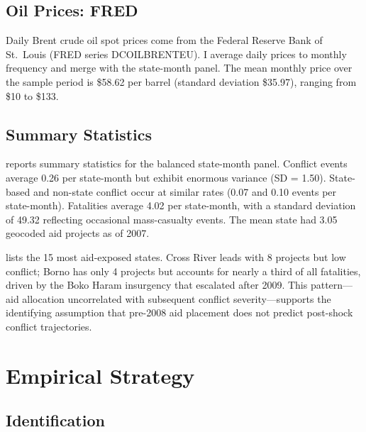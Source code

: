 \documentclass[12pt]{article}
\begin{document}
\subsection{Oil Prices: FRED}

Daily Brent crude oil spot prices come from the Federal Reserve Bank of St.\ Louis (FRED series DCOILBRENTEU). I average daily prices to monthly frequency and merge with the state-month panel. The mean monthly price over the sample period is \$58.62 per barrel (standard deviation \$35.97), ranging from \$10 to \$133.

\subsection{Summary Statistics}

 reports summary statistics for the balanced state-month panel. Conflict events average 0.26 per state-month but exhibit enormous variance (SD = 1.50). State-based and non-state conflict occur at similar rates (0.07 and 0.10 events per state-month). Fatalities average 4.02 per state-month, with a standard deviation of 49.32 reflecting occasional mass-casualty events. The mean state had 3.05 geocoded aid projects as of 2007.



 lists the 15 most aid-exposed states. Cross River leads with 8 projects but low conflict; Borno has only 4 projects but accounts for nearly a third of all fatalities, driven by the Boko Haram insurgency that escalated after 2009. This pattern---aid allocation uncorrelated with subsequent conflict severity---supports the identifying assumption that pre-2008 aid placement does not predict post-shock conflict trajectories.




\section{Empirical Strategy}
\label{sec:strategy}

\subsection{Identification}
\end{document}
